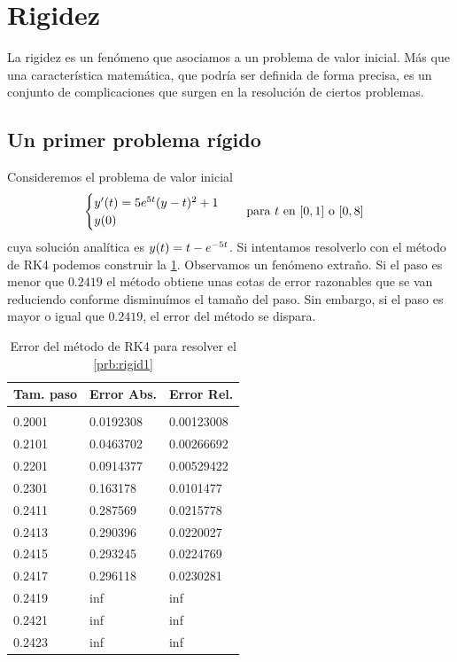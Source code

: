 \section{Rigidez}

La rigidez es un fenómeno que asociamos a un problema de valor inicial.
Más que una característica matemática,
que podría ser definida de forma precisa,
es un conjunto de complicaciones que surgen
en la resolución de ciertos problemas.

\subsection{Un primer problema rígido}

Consideremos el problema de valor inicial
\begin{equation}\label{prb:rigid1}
    \begin{cases}
        y'(t) = 5\nume^{5t}(y-t)^2 + 1 \\
        y(0)
    \end{cases}
    \qq{para $t$ en $[0,1]$ o $[0,8]$}
\end{equation}
cuya solución analítica es $y(t) = t - e^{-5t}$.
Si intentamos resolverlo con el método de RK4
podemos construir la \cref{tab:rigid-problem-rk4-step-error-comparison}.
Observamos un fenómeno extraño.
Si el paso es menor que $0.2419$
el método obtiene unas cotas de error razonables
que se van reduciendo conforme disminuímos el tamaño del paso.
Sin embargo, si el paso es mayor o igual que $0.2419$,
el error del método se dispara.

\begin{table}[h]
    \centering
    \begin{tabular}{lll}
        \textbf{Tam. paso} & \textbf{Error Abs.} & \textbf{Error Rel.} \\
        \hline \\
        0.2001 & 0.0192308 & 0.00123008 \\
        0.2101 & 0.0463702 & 0.00266692 \\
        0.2201 & 0.0914377 & 0.00529422 \\
        0.2301 & 0.163178  & 0.0101477 \\
        0.2411 & 0.287569  & 0.0215778 \\
        0.2413 & 0.290396  & 0.0220027 \\
        0.2415 & 0.293245  & 0.0224769 \\
        0.2417 & 0.296118  & 0.0230281 \\
        0.2419 & inf       & inf \\
        0.2421 & inf       & inf \\
        0.2423 & inf       & inf
    \end{tabular}
    \caption{Error del método de RK4 para resolver el \cref{prb:rigid1}}
    \label{tab:rigid-problem-rk4-step-error-comparison}
\end{table}

